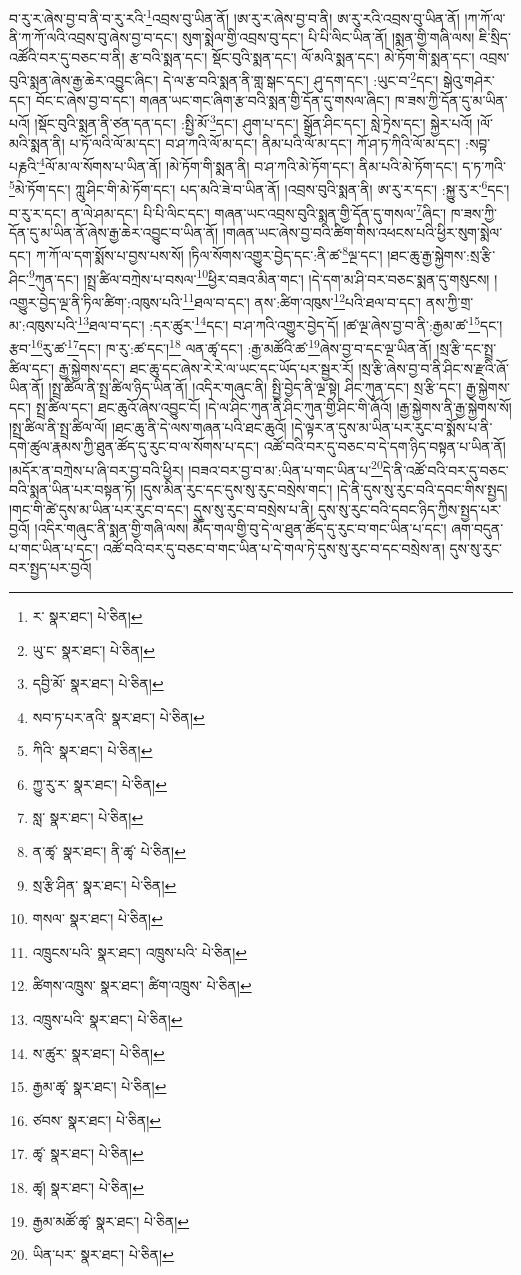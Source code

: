 བ་རུ་ར་ཞེས་བྱ་བ་ནི་བ་རུ་རའི་\footnote{ར་  སྣར་ཐང་།  པེ་ཅིན། }འབྲས་བུ་ཡིན་ནོ། །ཨ་རུ་ར་ཞེས་བྱ་བ་ནི། ཨ་རུ་རའི་འབྲས་བུ་ཡིན་ནོ། །ཀ་ཀོ་ལ་ནི་ཀ་ཀོ་ལའི་འབྲས་བུ་ཞེས་བྱ་བ་དང་། སུག་སྨེལ་གྱི་འབྲས་བུ་དང་། པི་པི་ལིང་ཡིན་ནོ། །སྨན་གྱི་གཞི་ལས། ཇི་སྲིད་འཚོའི་བར་དུ་བཅང་བ་ནི། རྩ་བའི་སྨན་དང་། སྡོང་བུའི་སྨན་དང་། ལོ་མའི་སྨན་དང་། མེ་ཏོག་གི་སྨན་དང་། འབྲས་བུའི་སྨན་ཞེས་རྒྱ་ཆེར་འབྱུང་ཞིང་། དེ་ལ་རྩ་བའི་སྨན་ནི་གླ་སྒང་དང་། ཤུ་དག་དང་། :ཡུང་བ་\footnote{ཡུ་ང་  སྣར་ཐང་།  པེ་ཅིན། }དང་། སྒེའུ་གཤེར་དང་། བོང་ང་ཞེས་བྱ་བ་དང་། གཞན་ཡང་གང་ཞིག་རྩ་བའི་སྨན་གྱི་དོན་དུ་གསལ་ཞིང་། ཁ་ཟས་ཀྱི་དོན་དུ་མ་ཡིན་པའོ། །སྡོང་བུའི་སྨན་ནི་ཙན་དན་དང་། :སྤྱི་མོ་\footnote{དབྱི་མོ་  སྣར་ཐང་།  པེ་ཅིན། }དང་། ཤུག་པ་དང་། སྒྲོན་ཤིང་དང་། སླེ་ཏྲེས་དང་། སྐྱེར་པའོ། །ལོ་མའི་སྨན་ནི། པ་ཏོ་ལའི་ལོ་མ་དང་། བ་ཤ་ཀའི་ལོ་མ་དང་། ནིམ་པའི་ལོ་མ་དང་། ཀོ་ཤ་ཏ་ཀིའི་ལོ་མ་དང་། :སབྟ་པརྞའི་\footnote{སབ་ཏ་པར་ནའི་  སྣར་ཐང་།  པེ་ཅིན། }ལོ་མ་ལ་སོགས་པ་ཡིན་ནོ། །མེ་ཏོག་གི་སྨན་ནི། བ་ཤ་ཀའི་མེ་ཏོག་དང་། ནིམ་པའི་མེ་ཏོག་དང་། ད་ཏ་ཀའི་\footnote{ཀིའི་  སྣར་ཐང་།  པེ་ཅིན། }མེ་ཏོག་དང་། ཀླུ་ཤིང་གི་མེ་ཏོག་དང་། པད་མའི་ཟེ་བ་ཡིན་ནོ། །འབྲས་བུའི་སྨན་ནི། ཨ་རུ་ར་དང་། :སྐྱུ་རུ་ར་\footnote{ཀྱུ་རུ་ར་  སྣར་ཐང་།  པེ་ཅིན། }དང་། བ་རུ་ར་དང་། ན་ལེ་ཤམ་དང་། པི་པི་ལིང་དང་། གཞན་ཡང་འབྲས་བུའི་སྨན་གྱི་དོན་དུ་གསལ་\footnote{སླ་  སྣར་ཐང་།  པེ་ཅིན། }ཞིང་། ཁ་ཟས་ཀྱི་དོན་དུ་མ་ཡིན་ནོ་ཞེས་རྒྱ་ཆེར་འབྱུང་བ་ཡིན་ནོ། །གཞན་ཡང་ཞེས་བྱ་བའི་ཚིག་གིས་འཕངས་པའི་ཕྱིར་སུག་སྨེལ་དང་། ཀ་ཀོ་ལ་དག་སྨོས་པ་བྱས་པས་སོ། །ཏིལ་སོགས་འགྱུར་བྱེད་དང་:ནི་ཚ་\footnote{ན་ཚྭ་  སྣར་ཐང་། ནི་ཚྭ་  པེ་ཅིན། }ལྔ་དང་། །ཐང་ཆུ་རྒྱ་སྐྱེགས་:སྲ་རྩི་ཤིང་\footnote{སྲ་རྩི་ཤིན་  སྣར་ཐང་།  པེ་ཅིན། }ཀུན་དང་། །སྤྲ་ཚིལ་བཀྲེས་པ་བསལ་\footnote{གསལ་  སྣར་ཐང་།  པེ་ཅིན། }ཕྱིར་བཟའ་མིན་གང་། །དེ་དག་མ་ཤི་བར་བཅང་སྨན་དུ་གསུངས། །འགྱུར་བྱེད་ལྔ་ནི་ཏིལ་ཚིག་:འཁུས་པའི་\footnote{འཁྲུངས་པའི་  སྣར་ཐང་། འཁྲུས་པའི་  པེ་ཅིན། }ཐལ་བ་དང་། ནས་:ཚིག་འཁུས་\footnote{ཚིགས་འཁྲུས་  སྣར་ཐང་། ཚིག་འཁྲུས་  པེ་ཅིན། }པའི་ཐལ་བ་དང་། ནས་ཀྱི་གྲ་མ་:འཁུས་པའི་\footnote{འཁྲུས་པའི་  སྣར་ཐང་།  པེ་ཅིན། }ཐལ་བ་དང་། :དར་ཚུར་\footnote{ས་ཚུར་  སྣར་ཐང་།  པེ་ཅིན། }དང་། བ་ཤ་ཀའི་འགྱུར་བྱེད་དོ། །ཚ་ལྔ་ཞེས་བྱ་བ་ནི་:རྒྱམ་ཚ་\footnote{རྒྱམ་ཚྭ་  སྣར་ཐང་།  པེ་ཅིན། }དང་། རྩབ་\footnote{ཙབས་  སྣར་ཐང་།  པེ་ཅིན། }རུ་ཚ་\footnote{ཚྭ་  སྣར་ཐང་།  པེ་ཅིན། }དང་། ཁ་རུ་:ཚ་དང་།\footnote{ཚྭ།  སྣར་ཐང་།  པེ་ཅིན། } ལན་ཚྭ་དང་། :རྒྱ་མཚོའི་ཚ་\footnote{རྒྱམ་མཚོ་ཚྭ་  སྣར་ཐང་།  པེ་ཅིན། }ཞེས་བྱ་བ་དང་ལྔ་ཡིན་ནོ། །སྲ་རྩི་དང་སྤྲ་ཚིལ་དང་། རྒྱ་སྐྱེགས་དང་། ཐང་ཆུ་དང་ཞེས་རེ་རེ་ལ་ཡང་དང་ཡོད་པར་སྦྱར་རོ། །སྲ་རྩི་ཞེས་བྱ་བ་ནི་ཤིང་ས་རྫའི་ཞོ་ཡིན་ནོ། །སྤྲ་ཚིལ་ནི་སྤྲ་ཚིལ་ཉིད་ཡིན་ནོ། །འདིར་གཞུང་ནི། སྤྱི་བྱེད་ནི་ལྔ་སྟེ། ཤིང་ཀུན་དང་། སྲ་རྩི་དང་། རྒྱ་སྐྱེགས་དང་། སྤྲ་ཚིལ་དང་། ཐང་ཆུའོ་ཞེས་འབྱུང་ངོ། །དེ་ལ་ཤིང་ཀུན་ནི་ཤིང་ཀུན་གྱི་ཤིང་གི་ཞོའོ། །རྒྱ་སྐྱེགས་ནི་རྒྱ་སྐྱེགས་སོ། །སྤྲ་ཚིལ་ནི་སྤྲ་ཚིལ་ལོ། །ཐང་ཆུ་ནི་དེ་ལས་གཞན་པའི་ཐང་ཆུའོ། །དེ་ལྟར་ན་དུས་མ་ཡིན་པར་རུང་བ་སྨོས་པ་ནི་དགེ་ཚུལ་རྣམས་ཀྱི་ཐུན་ཚོད་དུ་རུང་བ་ལ་སོགས་པ་དང་། འཚོ་བའི་བར་དུ་བཅང་བ་དེ་དག་ཉིད་བསྟན་པ་ཡིན་ནོ། །མདོར་ན་བཀྲེས་པ་ཞི་བར་བྱ་བའི་ཕྱིར། །བཟའ་བར་བྱ་བ་མ་:ཡིན་པ་གང་ཡིན་པ་\footnote{ཡིན་པར་  སྣར་ཐང་།  པེ་ཅིན། }དེ་ནི་འཚོ་བའི་བར་དུ་བཅང་བའི་སྨན་ཡིན་པར་བསྟན་ཏོ། །དུས་མིན་རུང་དང་དུས་སུ་རུང་བསྲེས་གང་། །དེ་ནི་དུས་སུ་རུང་བའི་དབང་གིས་སྤྱད། །གང་གི་ཚེ་དུས་མ་ཡིན་པར་རུང་བ་དང་། དུས་སུ་རུང་བ་བསྲེས་པ་ནི། དུས་སུ་རུང་བའི་དབང་ཉིད་ཀྱིས་སྤྱད་པར་བྱའོ། །འདིར་གཞུང་ནི་སྨན་གྱི་གཞི་ལས། མཽད་གལ་གྱི་བུ་དེ་ལ་ཐུན་ཚོད་དུ་རུང་བ་གང་ཡིན་པ་དང་། ཞག་བདུན་པ་གང་ཡིན་པ་དང་། འཚོ་བའི་བར་དུ་བཅང་བ་གང་ཡིན་པ་དེ་གལ་ཏེ་དུས་སུ་རུང་བ་དང་བསྲེས་ན། དུས་སུ་རུང་བར་སྤྱད་པར་བྱའོ། 